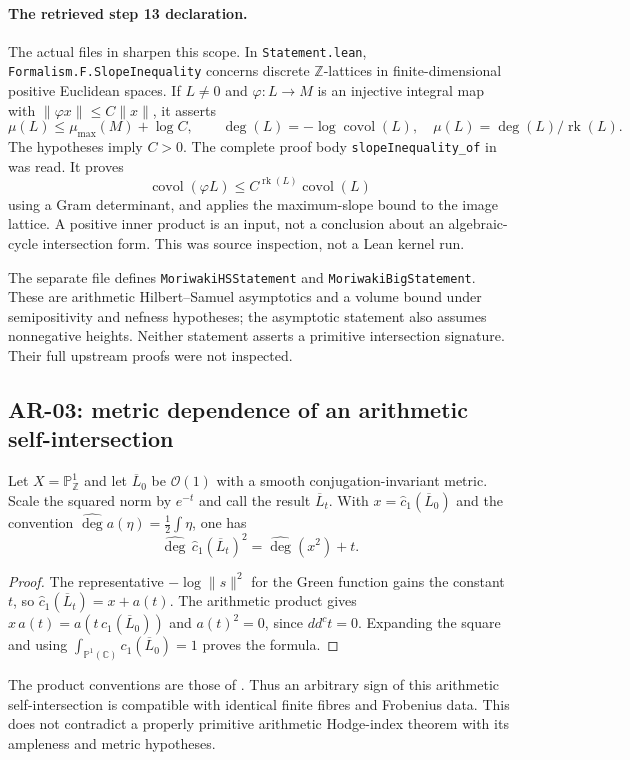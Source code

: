 \documentclass[11pt,a4paper]{article}
\theoremstyle{remark}
\begin{document}
\paragraph{The retrieved step 13 declaration.}
The actual files in  sharpen this scope.
In \texttt{Statement.lean}, \texttt{Formalism.F.SlopeInequality} concerns
discrete $\mathbb Z$-lattices in finite-dimensional positive Euclidean
spaces.  If $L\ne0$ and $\varphi:L\to M$ is an injective integral map
with $\|\varphi x\|\le C\|x\|$, it asserts
\[
 \mu(L)\le\mu_{\max}(M)+\log C,\qquad
 \deg(L)=-\log\operatorname{covol}(L),\quad
 \mu(L)=\deg(L)/\operatorname{rk}(L).
\]
The hypotheses imply $C>0$.  The complete proof body
\texttt{slopeInequality\_of} in
 was read.  It proves
\[
 \operatorname{covol}(\varphi L)
 \le C^{\operatorname{rk}(L)}\operatorname{covol}(L)
\]
using a Gram determinant, and applies the maximum-slope bound to the image
lattice.  A positive inner product is an input, not a conclusion about an
algebraic-cycle intersection form.  This was source inspection, not a Lean
kernel run.

The separate file
 defines
\texttt{MoriwakiHSStatement} and \texttt{MoriwakiBigStatement}.  These
are arithmetic Hilbert--Samuel asymptotics and a volume bound under
semipositivity and nefness hypotheses; the asymptotic statement also assumes
nonnegative heights.  Neither statement asserts a primitive intersection
signature.  Their full upstream proofs were not inspected.

\subsection{AR-03: metric dependence of an arithmetic self-intersection}
\label{ar:metric}

Let $X=\mathbb P^1_{\mathbb Z}$ and let $\overline L_0$ be
$\mathcal O(1)$ with a smooth conjugation-invariant metric.  Scale the
squared norm by $e^{-t}$ and call the result $\overline L_t$.  With
$x=\widehat c_1(\overline L_0)$ and the convention
$\widehat{\deg}a(\eta)=\frac12\int\eta$, one has
\[
 \widehat{\deg}\,\widehat c_1(\overline L_t)^2
       =\widehat{\deg}(x^2)+t.
\]
\begin{proof}
The representative $-\log\|s\|^2$ for the Green function gains the
constant $t$, so $\widehat c_1(\overline L_t)=x+a(t)$.  The arithmetic
product gives $x\,a(t)=a(t\,c_1(\overline L_0))$ and $a(t)^2=0$,
since $dd^ct=0$.  Expanding the square and using
$\int_{\mathbb P^1(\mathbb C)}c_1(\overline L_0)=1$ proves the formula.
\end{proof}
The product conventions are those of
\cite[\S4.2.11 and \S4.3, especially Theorem 4.3.2]{GilletSoule}.
Thus an arbitrary sign of this arithmetic self-intersection is compatible
with identical finite fibres and Frobenius data.  This does not contradict
a properly primitive arithmetic Hodge-index theorem with its ampleness and
metric hypotheses.
\end{document}
